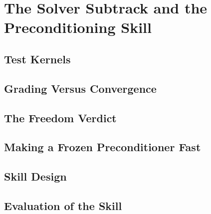 \chapter{The Solver Subtrack and the Preconditioning Skill}
\label{ch:solvers}

\section{Test Kernels}

\section{Grading Versus Convergence}

\section{The Freedom Verdict}

\section{Making a Frozen Preconditioner Fast}

\section{Skill Design}

\section{Evaluation of the Skill}
